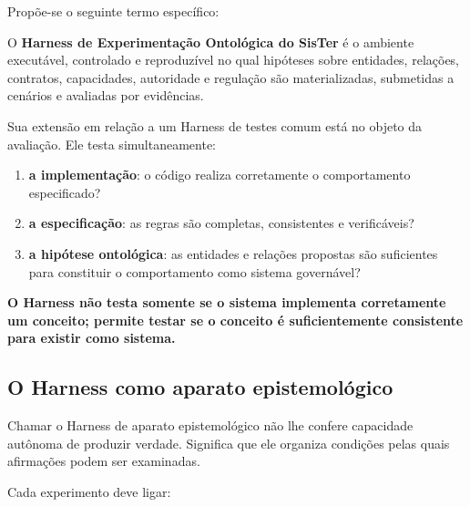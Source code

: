 \documentclass[11pt,a4paper,oneside]{article}
\begin{document}
Propõe-se o seguinte termo específico:

\begin{principio}
O \textbf{Harness de Experimentação Ontológica do SisTer} é o ambiente executável, controlado e reproduzível no qual hipóteses sobre entidades, relações, contratos, capacidades, autoridade e regulação são materializadas, submetidas a cenários e avaliadas por evidências.
\end{principio}

Sua extensão em relação a um Harness de testes comum está no objeto da avaliação. Ele testa simultaneamente:

\begin{enumerate}
  \item \textbf{a implementação}: o código realiza corretamente o comportamento especificado?
  \item \textbf{a especificação}: as regras são completas, consistentes e verificáveis?
  \item \textbf{a hipótese ontológica}: as entidades e relações propostas são suficientes para constituir o comportamento como sistema governável?
\end{enumerate}

\begin{principio}
\centering
\textbf{O Harness não testa somente se o sistema implementa corretamente um conceito; permite testar se o conceito é suficientemente consistente para existir como sistema.}
\end{principio}

\subsection{O Harness como aparato epistemológico}

Chamar o Harness de aparato epistemológico não lhe confere capacidade autônoma de produzir verdade. Significa que ele organiza condições pelas quais afirmações podem ser examinadas.

Cada experimento deve ligar:

\begin{center}
\end{center}
\end{document}
